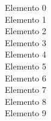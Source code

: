 \documentclass[preview]{standalone}
\begin{document}
Elemento 0\\Elemento 1\\Elemento 2\\Elemento 3\\Elemento 4\\Elemento 5\\Elemento 6\\Elemento 7\\Elemento 8\\Elemento 9\\
\end{document}
